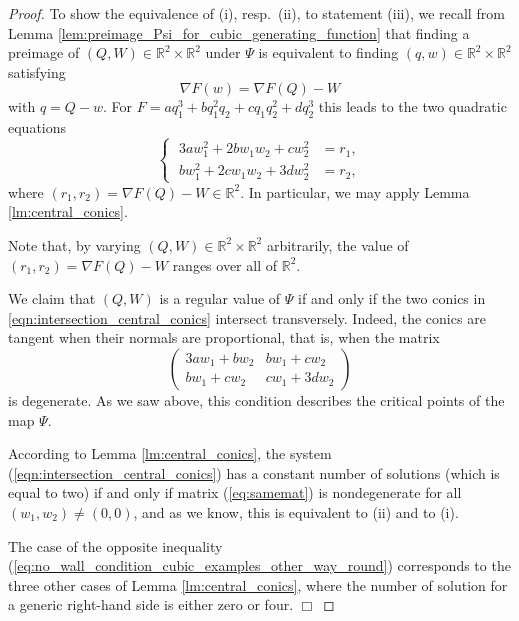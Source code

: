 \documentclass[12pt]{article}
\newcommand{\proofend}{$\Box$\bigskip}
\newcommand{\R}{{\mathbb R}}
\begin{document}
\begin{proof}
\medskip

To show the equivalence of (i), resp.~(ii), to statement (iii), we recall from Lemma \ref{lem:preimage_Psi_for_cubic_generating_function} that finding a preimage of $(Q,W)\in\R^2\times\R^2$ under $\Psi$ is equivalent to finding $(q,w)\in\R^2\times\R^2$ satisfying
\begin{equation}\nonumber
\nabla F(w)=\nabla F(Q)-W
\end{equation}
with $q=Q-w$. For $F=aq_1^3+bq_1^2q_2+cq_1q_2^2+dq_2^3$ this leads to the two quadratic equations
\begin{equation}\label{eqn:intersection_central_conics}
\left\{\;
\begin{aligned}
3aw_1^2+2bw_1w_2+cw_2^2&=r_1,\\
bw_1^2+2cw_1w_2+3dw_2^2&=r_2,
\end{aligned}
\right.
\end{equation}
where $(r_1,r_2)=\nabla F(Q)-W\in\R^2$. In particular, we may apply Lemma \ref{lm:central_conics}.

Note that, by varying $(Q,W)\in\R^2\times\R^2$ arbitrarily, the value of $(r_1,r_2)=\nabla F(Q)-W$ ranges over all of $\R^2$. 

We claim that $(Q,W)$ is a regular value of $\Psi$ if and only if the two conics in \eqref{eqn:intersection_central_conics} intersect transversely. Indeed, the conics are tangent when their normals are proportional, that is, when the matrix 
\begin{equation} \label{eq:samemat}
\begin{pmatrix}
3aw_1+bw_2 & bw_1+cw_2\\
bw_1+cw_2 & cw_1+3dw_2
\end{pmatrix}
\end{equation}
is degenerate. As we saw above, this condition describes the critical points of the map $\Psi$. 

According to Lemma \ref{lm:central_conics}, the system (\ref{eqn:intersection_central_conics}) has a constant number of solutions (which is equal to two) if and only if matrix (\ref{eq:samemat}) is nondegenerate for all $(w_1,w_2) \neq (0,0)$, and as we know, this is equivalent to (ii) and to (i). 

The case of the opposite inequality (\ref{eq:no_wall_condition_cubic_examples_other_way_round}) corresponds to the three other cases of Lemma \ref{lm:central_conics}, where the number of solution for a generic right-hand side is either zero or four.
\proofend
\end{proof}
\end{document}
